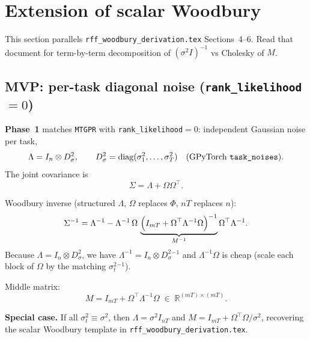 \documentclass[11pt]{article}
\theoremstyle{plain}
\newcommand{\noise}{\sigma^2}
\newcommand{\Sig}{\Sigma}
\newcommand{\Ph}{\Phi}
\newcommand{\Om}{\Omega}
\begin{document}
\section{Extension of scalar Woodbury}

This section parallels \texttt{rff\_woodbury\_derivation.tex} Sections~4--6.
Read that document for term-by-term decomposition of $(\noise I)^{-1}$ vs Cholesky of $M$.

\subsection{MVP: per-task diagonal noise (\texttt{rank\_likelihood}$=0$)}

\textbf{Phase~1} matches \texttt{MTGPR} with \texttt{rank\_likelihood}$=0$:
independent Gaussian noise per task,
\begin{equation}
  \Lambda = I_n \otimes D_\noise,
  \qquad
  D_\noise = \mathrm{diag}(\noise_1,\ldots,\noise_T)
  \quad\text{(GPyTorch \texttt{task\_noises}).}
\end{equation}
The joint covariance is
\begin{equation}
  \label{eq:sigma-mvp}
  \Sig = \Lambda + \Om\Om^\top.
\end{equation}

Woodbury inverse (structured $\Lambda$, $\Om$ replaces $\Ph$, $nT$ replaces $n$):
\begin{equation}
  \label{eq:woodbury-mt}
  \Sig^{-1}
  = \Lambda^{-1}
  - \Lambda^{-1}\,\Om\,
    \underbrace{\Bigl(I_{mT} + \Om^\top \Lambda^{-1} \Om\Bigr)^{-1}}_{M^{-1}}
    \Om^\top \Lambda^{-1}.
\end{equation}
Because $\Lambda = I_n \otimes D_\noise$, we have $\Lambda^{-1} = I_n \otimes D_\noise^{-1}$
and $\Lambda^{-1}\Om$ is cheap (scale each block of $\Om$ by the matching $\noise_t^{-1}$).

Middle matrix:
\begin{equation}
  M = I_{mT} + \Om^\top \Lambda^{-1} \Om
  \;\in\; \mathbb{R}^{(mT) \times (mT)}.
\end{equation}

\begin{samebox}
\textbf{Special case.} If all $\noise_t \equiv \noise$, then $\Lambda = \noise I_{nT}$ and
$M = I_{mT} + \Om^\top\Om / \noise$, recovering the scalar Woodbury template in
\texttt{rff\_woodbury\_derivation.tex}.
\end{samebox}
\end{document}
